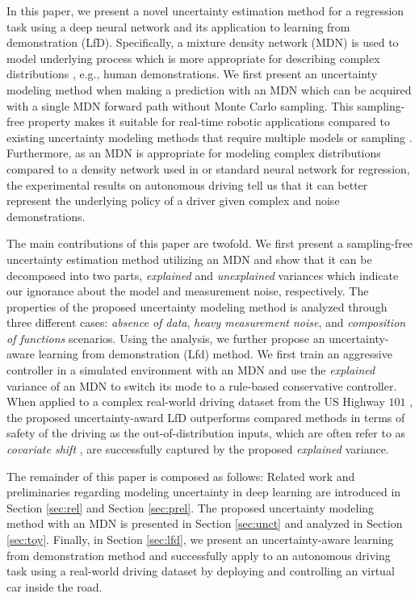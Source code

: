\documentclass[letterpaper, 10 pt, conference]{ieeeconf}  %
\begin{document}
In this paper, we present a novel uncertainty estimation method
for a regression task using a deep neural network and its application
to learning from demonstration (LfD).
Specifically, a mixture density network (MDN) \cite{Bishop_94} is used
to model underlying process which is more appropriate
for describing complex distributions \cite{Brando_17}, e.g., 
human demonstrations.
We first present an uncertainty modeling method when
making a prediction with an MDN which can be acquired with 
a single MDN forward path without Monte Carlo sampling. 
This sampling-free property makes it suitable for 
real-time robotic applications compared to 
existing uncertainty modeling methods that require multiple models 
\cite{Lakshminarayanan_16}
or sampling \cite{Gal_16, Gal_16_thesis, Kendall_17}.
Furthermore, as an MDN is appropriate for modeling 
complex distributions \cite{Mclachlan_88} compared to
a density network used in \cite{Kendall_17, Mclachlan_88}
or standard neural network for regression, 
the experimental results on autonomous driving tell us that 
it can better represent the underlying policy of a driver
given complex and noise demonstrations. 


The main contributions of this paper are twofold. 
We first present a sampling-free uncertainty estimation method 
utilizing an MDN
and show that it can be decomposed into two parts, 
\textit{explained} and \textit{unexplained} variances
which indicate our ignorance about the model
and measurement noise, respectively. 
The properties of the proposed uncertainty modeling method 
is analyzed through three different cases:
\textit{absence of data}, \textit{heavy measurement noise}, 
and \textit{composition of functions} scenarios. 
Using the analysis, we further propose an uncertainty-aware
learning from demonstration (Lfd) method. 
We first train an aggressive controller in a simulated environment
with an MDN and use the \textit{explained} variance of an MDN
to switch its mode to a rule-based conservative controller.
When applied to a complex real-world driving dataset
from the US Highway $101$ \cite{Colyar_07}, 
the proposed uncertainty-award LfD outperforms compared methods
in terms of safety of the driving as the out-of-distribution inputs, 
which are often refer to as
\textit{covariate shift} \cite{Ross_13}, 
are successfully captured by the proposed \textit{explained} variance. 


The remainder of this paper is composed as follows: 
Related work and preliminaries regarding modeling uncertainty
in deep learning are introduced in 
Section \ref{sec:rel} and Section \ref{sec:prel}. 
The proposed uncertainty modeling method with an MDN
is presented in Section \ref{sec:unct} and 
analyzed in Section \ref{sec:toy}.
Finally, in Section \ref{sec:lfd}, we present an uncertainty-aware
learning from demonstration method 
and successfully apply to an autonomous driving task 
using a real-world driving dataset by deploying and controlling
an virtual car inside the road. 
\end{document}
